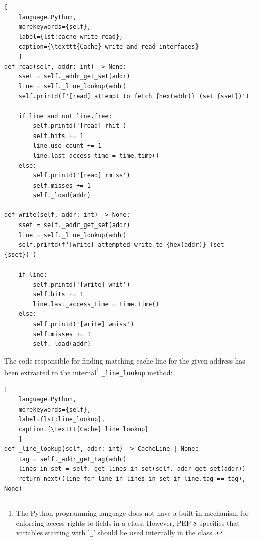 \begin{center}
\centering
\begin{minipage}{\linewidth}
\begin{lstlisting}[
    language=Python,
	morekeywords={self},
    label={lst:cache_write_read},
    caption={\texttt{Cache} write and read interfaces}
    ]
def read(self, addr: int) -> None:
    sset = self._addr_get_set(addr)
    line = self._line_lookup(addr)
    self.printd(f'[read] attempt to fetch {hex(addr)} (set {sset})')

    if line and not line.free:
        self.printd('[read] rhit')
        self.hits += 1
        line.use_count += 1
        line.last_access_time = time.time()
    else:
        self.printd('[read] rmiss')
        self.misses += 1
        self._load(addr)

def write(self, addr: int) -> None:
    sset = self._addr_get_set(addr)
    line = self._line_lookup(addr)
    self.printd(f'[write] attempted write to {hex(addr)} (set {sset})')

    if line:
        self.printd('[write] whit')
        self.hits += 1
        line.last_access_time = time.time()
    else:
        self.printd('[write] wmiss')
        self.misses += 1
        self._load(addr)
\end{lstlisting}
\end{minipage}
\end{center}

\noindent The code responsible for finding matching cache line for the given address has been extracted to the internal\footnote{The Python programming language does not have a
built-in mechanism for enforcing access rights to fields in a class. However, PEP 8 specifies that variables starting with '\texttt{\_}' should be used internally in the class
\cite{pep8}.} \texttt{\_line\_lookup} method:

\begin{center}
\centering
\begin{minipage}{\linewidth}
\begin{lstlisting}[
    language=Python,
	morekeywords={self},
    label={lst:line_lookup},
    caption={\texttt{Cache} line lookup}
    ]
def _line_lookup(self, addr: int) -> CacheLine | None:
    tag = self._addr_get_tag(addr)
    lines_in_set = self._get_lines_in_set(self._addr_get_set(addr))
    return next((line for line in lines_in_set if line.tag == tag), None)
\end{lstlisting}
\end{minipage}
\end{center}


